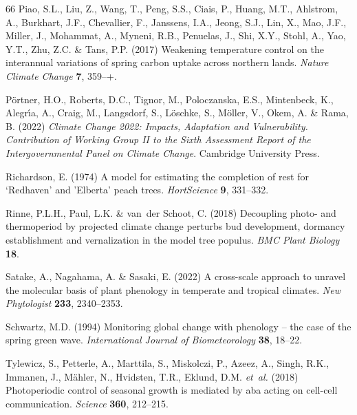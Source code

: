 \documentclass[11pt]{article}
\begin{document}
\begin{thebibliography}{66}
Piao, S.L., Liu, Z., Wang, T., Peng, S.S., Ciais, P., Huang, M.T., Ahlstrom,
  A., Burkhart, J.F., Chevallier, F., Janssens, I.A., Jeong, S.J., Lin, X.,
  Mao, J.F., Miller, J., Mohammat, A., Myneni, R.B., Penuelas, J., Shi, X.Y.,
  Stohl, A., Yao, Y.T., Zhu, Z.C. \& Tans, P.P. (2017) Weakening temperature
  control on the interannual variations of spring carbon uptake across northern
  lands. \emph{Nature Climate Change} \textbf{7}, 359--+.

P{\"o}rtner, H.O., Roberts, D.C., Tignor, M., Poloczanska, E.S., Mintenbeck,
  K., Alegr{\'\i}a, A., Craig, M., Langsdorf, S., L{\"o}schke, S., M{\"o}ller,
  V., Okem, A. \& Rama, B. (2022) \emph{Climate Change 2022: Impacts,
  Adaptation and Vulnerability. Contribution of Working Group II to the Sixth
  Assessment Report of the Intergovernmental Panel on Climate Change}.
  Cambridge University Press.

Richardson, E. (1974) A model for estimating the completion of rest for
  {`Redhaven' and 'Elberta'} peach trees. \emph{HortScience} \textbf{9},
  331--332.

Rinne, P.L.H., Paul, L.K. \& van~der Schoot, C. (2018) Decoupling photo- and
  thermoperiod by projected climate change perturbs bud development, dormancy
  establishment and vernalization in the model tree populus. \emph{BMC Plant
  Biology} \textbf{18}.

Satake, A., Nagahama, A. \& Sasaki, E. (2022) A cross-scale approach to unravel
  the molecular basis of plant phenology in temperate and tropical climates.
  \emph{New Phytologist} \textbf{233}, 2340--2353.

Schwartz, M.D. (1994) Monitoring global change with phenology -- the case of
  the spring green wave. \emph{International Journal of Biometeorology}
  \textbf{38}, 18--22.

Tylewicz, S., Petterle, A., Marttila, S., Miskolczi, P., Azeez, A., Singh,
  R.K., Immanen, J., M{\"a}hler, N., Hvidsten, T.R., Eklund, D.M. \emph{et~al.}
  (2018) Photoperiodic control of seasonal growth is mediated by aba acting on
  cell-cell communication. \emph{Science} \textbf{360}, 212--215.


\end{thebibliography}
\end{document}
